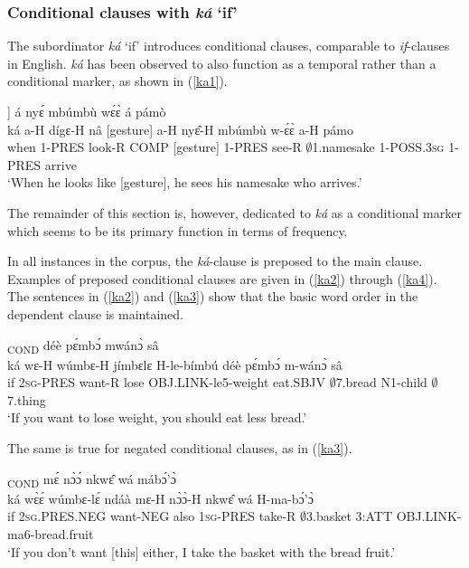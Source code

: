 \subsubsection{Conditional clauses with {\itshape ká} `if'}
\label{sec:Cond}

The subordinator {\itshape ká} `if' introduces conditional clauses, comparable to {\itshape if}-clauses in English.
{\itshape ká} has been observed to also function as a temporal rather than a conditional marker, as shown in (\ref{ka1}).

\begin{exe} 
\ex\label{ka1}
  \glll [{\bfseries ká} á dígɛ́ nâ [gesture]] á nyɛ́ mbúmbù wɛ́ɛ̀ á pámò \\
        ká a-H dígɛ-H nâ [gesture] a-H nyɛ̂-H mbúmbù w-ɛ́ɛ̀ a-H pámo \\
       when 1-PRES look-R COMP [gesture]  1-PRES see-R $\emptyset$1.namesake 1-POSS.3\textsc{sg} 1-PRES arrive \\
    \trans `When he looks like [gesture], he sees his namesake who arrives.'
\end{exe}

\noindent The remainder of this section is, however, dedicated to {\itshape ká} as a conditional marker which seems to be its primary function in terms of frequency.

In all instances in the corpus, the {\itshape ká}-clause is preposed to the main clause.  Examples of preposed conditional clauses are given in (\ref{ka2}) through (\ref{ka4}). The sentences in (\ref{ka2}) and (\ref{ka3}) show that the basic word order in the dependent clause is maintained.

\begin{exe}
\ex\label{ka2}
  \textsubscript{COND} déè pɛ́mbɔ́ mwánɔ̀ sâ \\
         ká wɛ-H wúmbɛ-H jímbɛlɛ H-le-bímbú déè pɛ́mbɔ́ m-wánɔ̀ sâ \\
        if 2\textsc{sg}-PRES want-R lose OBJ.LINK-le5-weight eat.SBJV $\emptyset$7.bread N1-child $\emptyset$7.thing \\
    \trans `If you want to lose weight, you should eat less bread.'
\end{exe}

\noindent The same is true for negated conditional clauses, as in (\ref{ka3}).

\begin{exe} 
\ex\label{ka3}
  \textsubscript{COND} mɛ́ nɔ̀ɔ́ nkwɛ̂ wá mábɔ́'ɔ̀ \\
        ká wɛ̀ɛ́ wúmbɛ-lɛ́ ndáà mɛ-H nɔ̀ɔ̀-H nkwɛ̂ wá H-ma-bɔ́'ɔ̀\\
         if 2\textsc{sg}.PRES.NEG want-NEG also 1\textsc{sg}-PRES take-R $\emptyset$3.basket 3:ATT OBJ.LINK-ma6-bread.fruit\\
    \trans `If you don't want [this] either, I take the basket with the bread fruit.'
\end{exe}

